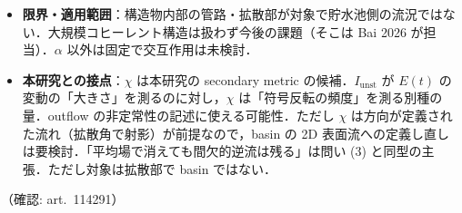 \documentclass[11pt]{jsarticle}
\begin{document}
\begin{itemize}
\begin{itemize}
  \end{itemize}
  \item \textbf{限界・適用範囲}：構造物内部の管路・拡散部が対象で貯水池側の流況ではない．大規模コヒーレント構造は扱わず今後の課題（そこは Bai 2026 が担当）．$\alpha$ 以外は固定で交互作用は未検討．
  \item \textbf{本研究との接点}：$\chi$ は本研究の secondary metric の候補．$I_\mathrm{unst}$ が $E(t)$ の変動の「大きさ」を測るのに対し，$\chi$ は「符号反転の頻度」を測る別種の量．outflow の非定常性の記述に使える可能性．ただし $\chi$ は方向が定義された流れ（拡散角で射影）が前提なので，basin の 2D 表面流への定義し直しは要検討．「平均場で消えても間欠的逆流は残る」は問い (3) と同型の主張．ただし対象は拡散部で basin ではない．
\end{itemize}
\noindent（確認: art.\ 114291）
\end{document}
